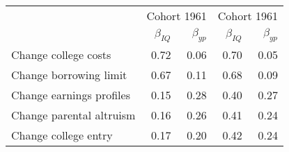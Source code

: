 \begin{tabular}{lrrrr}
\hline
   & \multicolumn{2}{|c|}{Cohort 1961} & \multicolumn{2}{|c|}{Cohort 1961} \\ 
 & $\beta_{IQ}$  & $\beta_{yp}$  & $\beta_{IQ}$  & $\beta_{yp}$  \\ 
\hline
Change college costs & 0.72  & 0.06  & 0.70  & 0.05  \\ 
Change borrowing limit & 0.67  & 0.11  & 0.68  & 0.09  \\ 
Change earnings profiles & 0.15  & 0.28  & 0.40  & 0.27  \\ 
Change parental altruism & 0.16  & 0.26  & 0.41  & 0.24  \\ 
Change college entry & 0.17  & 0.20  & 0.42  & 0.24  \\ 
\hline
\end{tabular}%
